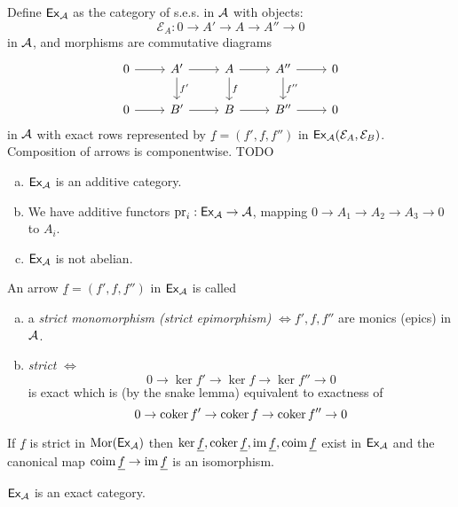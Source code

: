 \documentclass[a4paper]{report}
\begin{document}
\begin{defi}
Define $\mathsf{Ex}_{\mathcal{A}}$ as the category of s.e.s. in $\mathcal{A}$ with objects: \[\mathcal E_{A}: 0 \to A' \to A \to A'' \to 0\]in $\mathcal{A}$, and morphisms are commutative diagrams \[\begin{tikzcd}
0 \arrow[r] & A' \arrow[r] \arrow[d, "f'"] & A \arrow[r] \arrow[d, "f"] & A'' \arrow[r] \arrow[d, "f''"] & 0 \\
0 \arrow[r] & B' \arrow[r]                   & B \arrow[r]               & B'' \arrow[r]                   & 0
\end{tikzcd}\]in $\mathcal{A}$ with exact rows represented by $\underline f = (f', f, f'')$ in $\mathsf{Ex}_{\mathcal{A}}(\mathcal E_{A}, \mathcal E_{B})$. Composition of arrows is componentwise. TODO
\end{defi}
\begin{prop}
\begin{enumerate}[(a)]
  \item $\mathsf{Ex}_{\mathcal{A}}$ is an additive category.
  \item We have additive functors $\operatorname{pr}_{i}: \mathsf{Ex}_{\mathcal{A}} \to \mathcal{A}$, mapping $0 \to A_{1} \to A_{2} \to A_{3} \to 0$ to $A_{i}$.
  \item $\mathsf{Ex}_{\mathcal{A}}$ is not abelian.
\end{enumerate}


\begin{defi}
  An arrow $\underline f = (f', f, f'')$ in $\mathsf{Ex}_{\mathcal{A}}$ is called
  \begin{enumerate}[(a)]
    \item a \emph{strict monomorphism (strict epimorphism)} $\iff f', f, f''$ are monics (epics) in $\mathcal{A}$.
    \item \emph{strict} $\iff$ \[0 \to \ker f' \to \ker f \to \ker f'' \to 0\] is exact which is (by the snake lemma) equivalent to exactness of \[0 \to \operatorname{coker} f' \to \operatorname{coker} f \to \operatorname{coker} f'' \to 0\]
  \end{enumerate}

\end{defi}
\end{prop}

\begin{prop}
If $\underline f$ is strict in $\operatorname{Mor} (\mathsf{Ex}_{\mathcal{A}})$ then $\ker \underline f, \operatorname{coker} \underline f, \operatorname{im} \underline f, \operatorname{coim} \underline f$ exist in $\mathsf{Ex}_{\mathcal{A}}$ and the canonical map $\operatorname{coim} \underline f \to \operatorname{im} \underline f$ is an isomorphism.
\end{prop}

\begin{rem*}
$\mathsf{Ex}_{\mathcal{A}}$ is an exact category.
\end{rem*}
\end{document}
